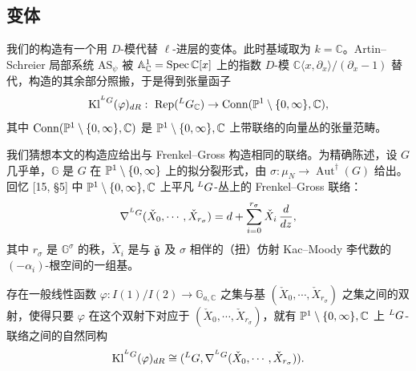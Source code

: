 \subsection{变体}

我们的构造有一个用 $D$-模代替 $\ell$-进层的变体。此时基域取为 $k=\mathbb{C}$。Artin--Schreier 局部系统 $\mathrm{AS}_\psi$ 被 $\mathbb{A}^1_\mathbb{C}=\operatorname{Spec}\mathbb{C}[x]$ 上的指数 $D$-模 $\mathbb{C}\langle x,\partial_x\rangle/(\partial_x-1)$ 替代，构造的其余部分照搬，于是得到张量函子
\[
\mathrm{Kl}^{{}^L G}(\varphi)_{dR}:\ \mathrm{Rep}({}^L G_\mathbb{C})\to\mathrm{Conn}(\mathbb{P}^1\setminus\{0,\infty\},\mathbb{C}),
\]
其中 $\mathrm{Conn}(\mathbb{P}^1\setminus\{0,\infty\},\mathbb{C})$ 是 $\mathbb{P}^1\setminus\{0,\infty\},\mathbb{C}$ 上带联络的向量丛的张量范畴。

我们猜想本文的构造应给出与 Frenkel--Gross 构造相同的联络。为精确陈述，设 $G$ 几乎单，$\mathbb{G}$ 是 $G$ 在 $\mathbb{P}^1\setminus\{0,\infty\}$ 上的拟分裂形式，由 $\sigma:\mu_N\to\operatorname{Aut}^\dagger(G)$ 给出。回忆 [15, §5] 中 $\mathbb{P}^1\setminus\{0,\infty\},\mathbb{C}$ 上平凡 ${}^L G$-丛上的 Frenkel--Gross 联络：
\[
\nabla^{{}^L G}(\check X_0,\cdots,\check X_{r_\sigma})=d+\sum_{i=0}^{r_\sigma}\check X_i\,\frac{d}{dz},
\]
其中 $r_\sigma$ 是 $\mathbb{G}^\sigma$ 的秩，$\check X_i$ 是与 $\check{\mathfrak g}$ 及 $\sigma$ 相伴的（扭）仿射 Kac--Moody 李代数的 $(-\alpha_i)$-根空间的一组基。

\begin{conjecture}
存在一般线性函数 $\varphi:I(1)/I(2)\to\mathbb{G}_{a,\mathbb{C}}$ 之集与基 $(\check X_0,\cdots,\check X_{r_\sigma})$ 之集之间的双射，使得只要 $\varphi$ 在这个双射下对应于 $(\check X_0,\cdots,\check X_{r_\sigma})$，就有 $\mathbb{P}^1\setminus\{0,\infty\},\mathbb{C}$ 上 ${}^L G$-联络之间的自然同构
\[
\mathrm{Kl}^{{}^L G}(\varphi)_{dR}\cong({}^L G,\nabla^{{}^L G}(\check X_0,\cdots,\check X_{r_\sigma})).
\]
\end{conjecture}
